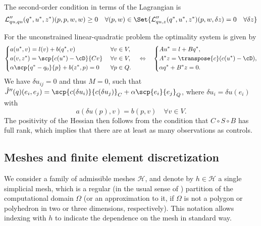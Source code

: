 The second-order condition in terms of the Lagrangian is
%
\begin{equation}\label{eq:SOLagrange}
\mathcal L''_{qu,qu}(q^*,u^*,z^*)(p, p,w,w) \ge 0 \quad \forall (p,w)\in \Set{\mathcal L''_{qu,z}(q^*,u^*,z^*)(p, w,\delta z) = 0\quad \forall \delta z}
\end{equation}
%
%
\begin{example}[continues=example:LQ]
For the unconstrained linear-quadratic problem the optimality system is given by
%
\begin{equation}\label{eq:OSLQ}
%
\left\{
\begin{aligned}
&a(u^*,v) = l(v) + b(q^*,v)&\;&\forall v\in V,\\
&a(v, z^*) = \scp{c(u^*)-\cD}{Cv}&\;&\forall v\in V,\\
&\alpha\scp{q^*-q_0}{p}+b(z^*,p) =0&\;&\forall p\in Q.
\end{aligned}
\right.
\quad\Leftrightarrow\quad 
%
\left\{
\begin{aligned}
&A u^* = l + Bq^*,\\
&A^* z = \transpose{c}(c(u^*)-\cD),\\
&\alpha q^* + B^* z= 0.
\end{aligned}
\right.
%
\end{equation}
%
We have $\delta u_{ij}=0$ and thus $M=0$, such that $\hat J''(q)(e_i,e_j) = \scp{c(\delta u_i)}{c(\delta u_j)}_C + \alpha\scp{e_i}{e_j}_Q$, where  $\delta u_i = \delta u(e_i)$ with
%
\begin{equation}\label{eq:TangentLQ}
a(\delta u(p),v) = b(p,v)\quad\forall v\in V.
\end{equation}
%
The positivity of the Hessian then follows from the condition that $C\circ S\circ B$ has full rank, which implies that there are at least as many observations as controls.
\end{example}
%


%
\subsection{Meshes and finite element discretization}\label{subsec:MeshesAndFem}
%
We consider a family of admissible meshes $\mathcal H$, and denote by $h\in\mathcal H$ a single simplicial mesh, which is a regular (in the usual sense of \cite{Ciarlet02}) partition of the computational domain $\Omega$ (or an approximation to it, if $\Omega$ is not a polygon or polyhedron in two or three dimensions, respectively).
This notation allows indexing with $h$ to indicate the dependence on the mesh in standard way.

